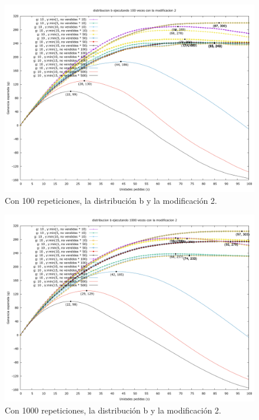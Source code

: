 \documentclass[12pt, spanish]{article}
\begin{document}
\begin{figure}[H]
	\centering
	\includegraphics[scale = 0.2]{prob_b/datos_b_100_2.png}
	\caption{Con 100 repeticiones, la distribución b y la modificación 2.}
	\label{fig:ej1_a_100}

\end{figure}

\begin{figure}[H]
	\centering
	\includegraphics[scale = 0.2]{prob_b/datos_b_1000_2.png}
	\caption{Con 1000 repeticiones, la distribución b y la modificación 2.}
	\label{fig:ej1_a_1000}

\end{figure}
\end{document}
